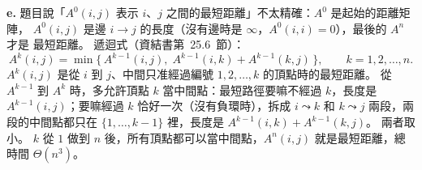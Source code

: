 \begin{pastsoln}
\textbf{e.} 題目說「$A^{0}(i, j)$ 表示 $i$、$j$ 之間的最短距離」不太精確：$A^{0}$ 是起始的距離矩陣，
$A^{0}(i, j)$ 是邊 $i \to j$ 的長度（沒有邊時是 $\infty$，$A^{0}(i, i) = 0$），最後的 $A^{n}$ 才是
最短距離。 遞迴式（資結書第~25.6~節）：
\[
A^{k}(i, j) = \min\bigl\{\, A^{k-1}(i, j),\; A^{k-1}(i, k) + A^{k-1}(k, j) \,\bigr\},
\qquad k = 1, 2, \ldots, n .
\]
$A^{k}(i, j)$ 是從 $i$ 到 $j$、中間只准經過編號 $1, 2, \ldots, k$ 的頂點時的最短距離。 從 $A^{k-1}$
到 $A^{k}$ 時，多允許頂點 $k$ 當中間點：最短路徑要嘛不經過 $k$，長度是 $A^{k-1}(i, j)$；要嘛經過
$k$ 恰好一次（沒有負環時），拆成 $i \leadsto k$ 和 $k \leadsto j$ 兩段，兩段的中間點都只在
$\{1, \ldots, k - 1\}$ 裡，長度是 $A^{k-1}(i, k) + A^{k-1}(k, j)$。 兩者取小。 $k$ 從 $1$ 做到 $n$
後，所有頂點都可以當中間點，$A^{n}(i, j)$ 就是最短距離，總時間 $\Theta(n^3)$。
\end{pastsoln}
